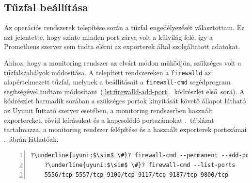 \subsection{Tűzfal beállítása}
Az operációs rendszerek telepítése során a tűzfal engedélyezését választottam. Ez azt jelentette, hogy szinte minden port zárva volt a külvilág felé, így a Prometheus szerver sem tudta elérni az exporterek által szolgáltatott adatokat.

Ahhoz, hogy a monitoring rendszer az elvárt módon működjön, szükséges volt a tűzfalszabályok módosítása. A telepített rendszereken a \texttt{firewalld} az alapértelmezett tűzfal, melynek a beállításait a \texttt{firewall-cmd} segédprogram segítségével tudtam módosítani~(\ref{lst:firewalld-add-port}.~kódrészlet első~sora). A kódrészlet harmadik sorában a szükséges portok kinyitását követő állapot látható az Uyunit futtató szerver esetében, a monitoring rendszerben használt exportereket, rövid leírásukat és a kapcsolódó portszámokat .~táblázat tartalmazza, a monitoring rendszer felépítése és a használt exporterek portszámai .~ábrán láthatóak.

\vspace{2mm}
\begin{lstlisting}[caption=Tűzfalszabályok módosítása.,label=lst:firewalld-add-port, numbers=left,escapechar=?]
	?\underline{uyuni:$\sim$ \#}? firewall-cmd --permanent --add-port=9117/tcp
	?\underline{uyuni:$\sim$ \#}? firewall-cmd --list-ports
	5556/tcp 5557/tcp 9100/tcp 9117/tcp 9187/tcp 9800/tcp
\end{lstlisting}

